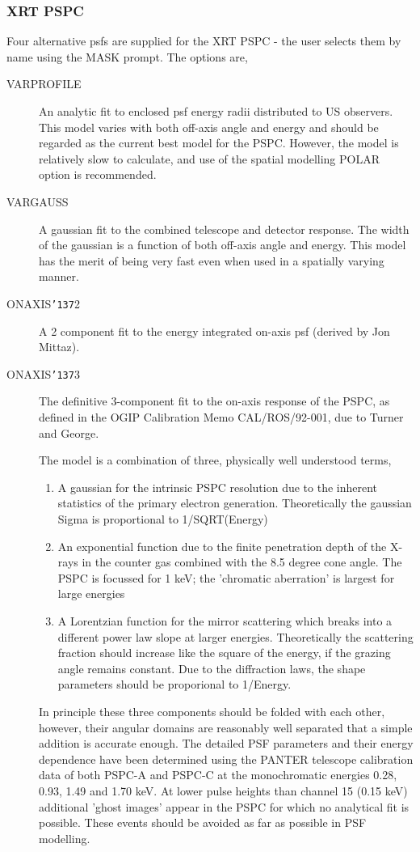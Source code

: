 \documentclass{book}
\renewcommand{\_}{{\tt\char'137}}     %
\begin{document}
\subsubsection{XRT PSPC}
Four alternative psfs are supplied for the XRT PSPC - the user
selects them by name using the MASK prompt. The options are,
 
\begin{description}
\item[VARPROFILE]
An analytic fit to enclosed psf energy radii distributed to
US observers. This model varies with both off-axis angle and
energy and should be regarded as the current best model for
the PSPC. However, the model is relatively slow to calculate,
and use of the spatial modelling POLAR option is recommended.
\item[VARGAUSS]
A gaussian fit to the combined telescope and detector
response. The width of the gaussian is a function of
both off-axis angle and energy. This model has the merit of
being very fast even when used in a spatially varying manner.
\item[ONAXIS\_2]
A 2 component fit to the energy integrated on-axis psf
(derived by Jon Mittaz).
\item[ONAXIS\_3]
The definitive 3-component fit to the on-axis response of the
PSPC, as defined in the OGIP Calibration Memo CAL/ROS/92-001,
due to Turner and George.
 
The model is a combination of three, physically well understood
terms,
 
 
\begin{enumerate}
\item A gaussian for the intrinsic PSPC resolution due to the
inherent statistics of the primary electron generation.
Theoretically the gaussian Sigma is proportional to
1/SQRT(Energy)
\item An exponential function due to the finite penetration
depth of the X-rays in the counter gas combined with the
8.5 degree cone angle. The PSPC is focussed for 1 keV; the
'chromatic aberration' is largest for large energies
\item A Lorentzian function for the mirror scattering which breaks
into a different power law slope at larger energies.
Theoretically the scattering fraction should increase like
the square of the energy, if the grazing angle remains
constant. Due to the diffraction laws, the shape parameters
should be proporional to 1/Energy.
\end{enumerate}
In principle these three components should be folded with each
other, however, their angular domains are reasonably well
separated that a simple addition is accurate enough. The
detailed PSF parameters and their energy dependence have been
determined using the PANTER telescope calibration data of both
PSPC-A and PSPC-C at the monochromatic energies 0.28, 0.93,
1.49 and 1.70 keV. At lower pulse heights than channel 15
(0.15 keV) additional 'ghost images' appear in the PSPC for
which no analytical fit is possible. These events should be
avoided as far as possible in PSF modelling.
 
\end{description}
\end{document}

